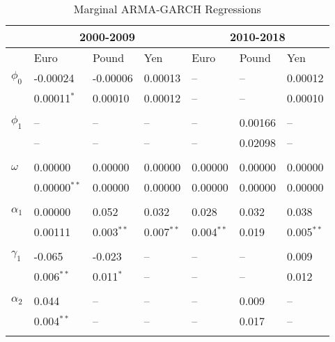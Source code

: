 \begin{table}
	\centering
	\begin{threeparttable}
		\caption{Marginal ARMA-GARCH Regressions}	\label{tbl:marginal_model_regressions}
		\begin{tabular}{l l l l | l l l}
			\midrule
					   & \multicolumn{3}{c}{2000-2009} & \multicolumn{3}{c}{2010-2018} \\
			\midrule
					   & Euro & Pound & Yen & Euro & Pound & Yen \\
			\midrule
			 $\phi_{0}$    &  -0.00024        & -0.00006     & 0.00013      &    --        &    --        & 0.00012      \\
						   &   0.00011$^{*}$  &  0.00010     & 0.00012      &    --        &    --        & 0.00010      \\ \\
			 $\phi_{1}$    &     --           &     --       &    --        &    --        & 0.00166      &    --        \\
						   &     --           &     --       &    --        &    --        & 0.02098      &    --        \\ \\
			 $\omega$      &  0.00000         &  0.00000     & 0.00000      & 0.00000      & 0.00000      & 0.00000      \\
						   &  0.00000$^{**}$  &  0.00000     & 0.00000      & 0.00000      & 0.00000      & 0.00000      \\ \\
			 $\alpha_{1}$  &  0.00000         &  0.052       & 0.032        & 0.028        & 0.032        & 0.038        \\
						   &  0.00111         & 0.003$^{**}$ & 0.007$^{**}$ & 0.004$^{**}$ & 0.019        & 0.005$^{**}$ \\ \\
			 $\gamma_{1}$  & -0.065           & -0.023       &    --        &    --        &    --        & 0.009        \\
						   &  0.006$^{**}$    & 0.011$^{*}$  &    --        &    --        &    --        & 0.012        \\ \\
			 $\alpha_{2}$  &  0.044           &    --        &    --        &    --        & 0.009        &    --        \\
						   &  0.004$^{**}$    &    --        &    --        &    --        & 0.017        &    --        \\ \\

\end{tabular}
\end{threeparttable}
\end{table}
